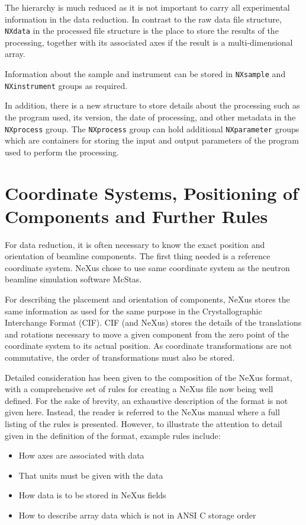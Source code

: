 \documentclass[%
 aip,
rsi,
 amsmath,amssymb,
 reprint,%
]{revtex4-1}
\begin{document}
The hierarchy is much reduced as it is not important to carry all experimental information in the data 
reduction. In contrast to the raw data file structure, \texttt{NXdata} in the processed file structure is the place 
to store the results of the processing, together with its associated axes if the result is a multi-dimensional array.   
 
Information about the sample and instrument can be stored in \texttt{NXsample} and \texttt{NXinstrument} groups as required. 

In addition, there is a new structure to store details about the processing such as the program used, its version, 
the date of processing, and other metadata 
in the \texttt{NXprocess} group. The \texttt{NXprocess} group can hold additional \texttt{NXparameter} groups which are containers 
for storing the input and output parameters of the program used to perform the processing. 

\section{Coordinate Systems, Positioning of Components and Further Rules}

For data reduction, it is often necessary to know the exact position and orientation of beamline components. 
The first thing needed is a reference coordinate system. NeXus chose to use same coordinate system as the 
neutron beamline simulation software McStas\cite{mcstas}. 

For describing the placement and orientation of components, NeXus stores the same information as used for the 
same purpose in the Crystallographic Interchange Format (CIF)\cite{ITCVG}. CIF (and NeXus) stores the details 
of the translations and rotations necessary to move a given component from the zero point of the coordinate 
system to its actual position. As coordinate transformations are not commutative, the order of transformations 
must also be stored.

Detailed consideration has been given to the composition of the NeXus format, 
with a comprehensive set of rules for creating a NeXus file now being well defined. 
For the sake of brevity, an exhaustive description of the format is not given here.
Instead, the reader is referred to the NeXus manual\cite{nxman} where a full listing of the 
rules is presented. However, to illustrate the attention to detail given in the 
definition of the format, example rules include:
\begin{itemize}
\item How axes are associated with data
\item That units must be given with the data
\item How data is to be stored in NeXus fields
\item How to describe array data which is not in ANSI C storage order
\end{itemize}
\end{document}
